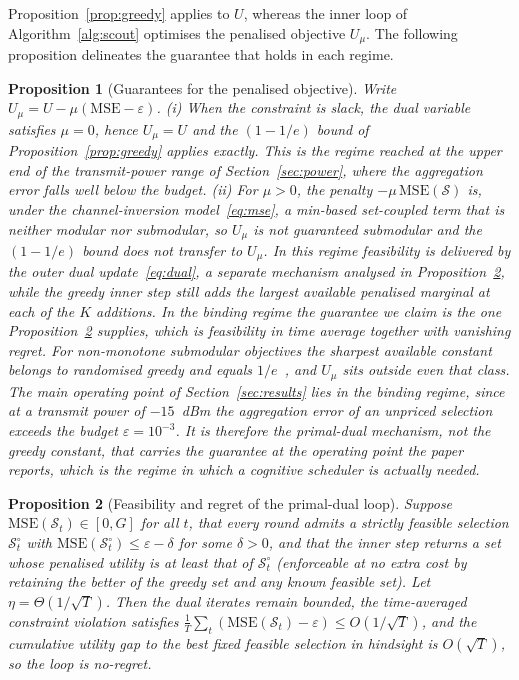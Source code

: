 \documentclass[lettersize,journal]{IEEEtran}
\newtheorem{proposition}{Proposition}
\newcommand{\calS}{\mathcal{S}}
\begin{document}
Proposition~\ref{prop:greedy} applies to $U$, whereas the inner loop of Algorithm~\ref{alg:scout} optimises the penalised objective $U_\mu$. The following proposition delineates the guarantee that holds in each regime.

\begin{proposition}[Guarantees for the penalised objective]\label{prop:penalised}
Write $U_\mu=U-\mu(\mathrm{MSE}-\varepsilon)$. \emph{(i)} When the constraint is slack, the dual variable satisfies $\mu=0$, hence $U_\mu=U$ and the $(1-1/e)$ bound of Proposition~\ref{prop:greedy} applies exactly. This is the regime reached at the upper end of the transmit-power range of Section~\ref{sec:power}, where the aggregation error falls well below the budget. \emph{(ii)} For $\mu>0$, the penalty $-\mu\,\mathrm{MSE}(\calS)$ is, under the channel-inversion model~\eqref{eq:mse}, a min-based set-coupled term that is neither modular nor submodular, so $U_\mu$ is not guaranteed submodular and the $(1-1/e)$ bound does not transfer to $U_\mu$. In this regime feasibility is delivered by the outer dual update~\eqref{eq:dual}, a separate mechanism analysed in Proposition~\ref{prop:pd}, while the greedy inner step still adds the largest available penalised marginal at each of the $K$ additions. In the binding regime the guarantee we claim is the one Proposition~\ref{prop:pd} supplies, which is feasibility in time average together with vanishing regret. For non-monotone submodular objectives the sharpest available constant belongs to randomised greedy and equals $1/e$~\cite{buchbinder2014}, and $U_\mu$ sits outside even that class. The main operating point of Section~\ref{sec:results} lies in the binding regime, since at a transmit power of $-15$~dBm the aggregation error of an unpriced selection exceeds the budget $\varepsilon=10^{-3}$.%
It is therefore the primal-dual mechanism, not the greedy constant, that carries the guarantee at the operating point the paper reports, which is the regime in which a cognitive scheduler is actually needed.
\end{proposition}

\begin{proposition}[Feasibility and regret of the primal-dual loop]\label{prop:pd}
Suppose $\mathrm{MSE}(\calS_t)\in[0,G]$ for all $t$, that every round admits a strictly feasible selection $\calS^{\circ}_t$ with $\mathrm{MSE}(\calS^{\circ}_t)\le\varepsilon-\delta$ for some $\delta>0$, and that the inner step returns a set whose penalised utility is at least that of $\calS^{\circ}_t$ (enforceable at no extra cost by retaining the better of the greedy set and any known feasible set). Let $\eta=\Theta(1/\sqrt{T})$. Then the dual iterates remain bounded, the time-averaged constraint violation satisfies $\frac{1}{T}\sum_{t}(\mathrm{MSE}(\calS_t)-\varepsilon)\le O(1/\sqrt{T})$, and the cumulative utility gap to the best fixed feasible selection in hindsight is $O(\sqrt{T})$, so the loop is no-regret.
\end{proposition}
\end{document}
